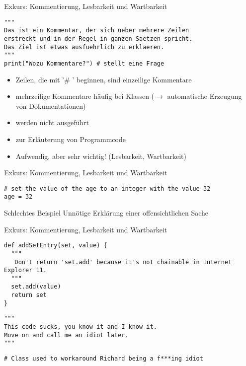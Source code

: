\begin{frame}[fragile]{Exkurs: Kommentierung, Lesbarkeit und Wartbarkeit}
    \begin{lstlisting}
"""
Das ist ein Kommentar, der sich ueber mehrere Zeilen
erstreckt und in der Regel in ganzen Saetzen spricht.
Das Ziel ist etwas ausfuehrlich zu erklaeren.
"""
print("Wozu Kommentare?") # stellt eine Frage
    \end{lstlisting}
    \begin{itemize}
        \item Zeilen, die mit '\# ' beginnen, sind einzeilige Kommentare
        \item mehrzeilige Kommentare häufig bei Klassen ($\rightarrow$ automatische 
        Erzeugung von Dokumentationen)
        \item werden nicht ausgeführt
        \item zur Erläuterung von Programmcode
        \item Aufwendig, aber sehr wichtig! (Lesbarkeit, Wartbarkeit)
    \end{itemize}
\end{frame}

\begin{frame}[fragile]{Exkurs: Kommentierung, Lesbarkeit und Wartbarkeit}
    \begin{lstlisting}
# set the value of the age to an integer with the value 32
age = 32
    \end{lstlisting}
    \pause{}
    \begin{alertblock}{Schlechtes Beispiel}
    Unnötige Erklärung einer offensichtlichen Sache
    \end{alertblock}
\end{frame}

\begin{frame}[fragile]{Exkurs: Kommentierung, Lesbarkeit und Wartbarkeit}
    \begin{lstlisting}
def addSetEntry(set, value) {   
  """ 
   Don't return 'set.add' because it's not chainable in Internet Explorer 11.
  """ 
  set.add(value)    
  return set
}
    \end{lstlisting}
    \pause{}
    \begin{lstlisting}
"""
This code sucks, you know it and I know it.  
Move on and call me an idiot later.
"""
    \end{lstlisting}
    \pause{}
    \begin{lstlisting}
# Class used to workaround Richard being a f***ing idiot
    \end{lstlisting}
\end{frame}

